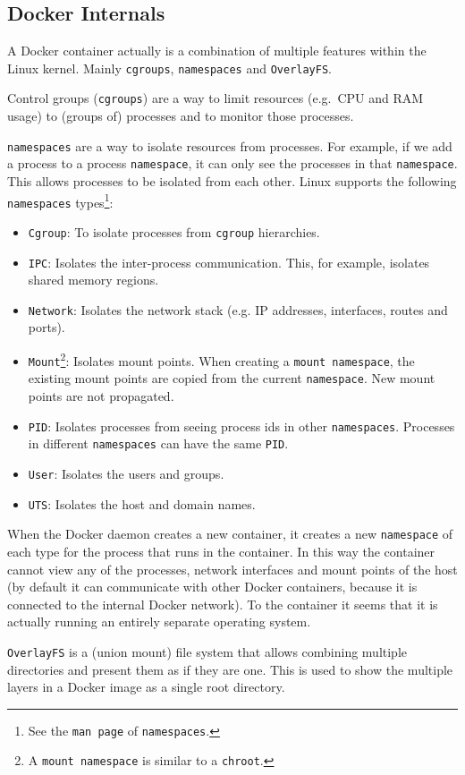 \subsection{Docker Internals}\label{subsubsection:internals}
A Docker container actually is a combination of multiple features within the Linux kernel.
Mainly \lstinline{cgroups}, \lstinline{namespaces} and \lstinline{OverlayFS}.

\medskip

Control groups (\lstinline{cgroups}) are a way to limit resources (e.g.\ CPU and RAM usage) to (groups of) processes and to monitor those processes.

\medskip

\lstinline{namespaces} are a way to isolate resources from processes. For example, if we add a process to a process \lstinline{namespace}, it can only see the processes in that \lstinline{namespace}. This allows processes to be isolated from each other. Linux supports the following \lstinline{namespaces} types\footnote{See the \lstinline{man page} of \lstinline{namespaces}.}:
\begin{itemize}
    \item \lstinline{Cgroup}: To isolate processes from \lstinline{cgroup} hierarchies.
    \item \lstinline{IPC}: Isolates the inter-process communication. This, for example, isolates shared memory regions.
    \item \lstinline{Network}: Isolates the network stack (e.g. IP addresses, interfaces, routes and ports).
    \item \lstinline{Mount}\footnote{A \lstinline{mount namespace} is similar to a \lstinline{chroot}.}: Isolates mount points. When creating a \lstinline{mount namespace}, the existing mount points are copied from the current \lstinline{namespace}. New mount points are not propagated.
    \item \lstinline{PID}: Isolates processes from seeing process ids in other \lstinline{namespaces}. Processes in different \lstinline{namespaces} can have the same \lstinline{PID}.
    \item \lstinline{User}: Isolates the users and groups.
    \item \lstinline{UTS}: Isolates the host and domain names.
\end{itemize}

When the Docker daemon creates a new container, it creates a new \lstinline{namespace} of each type for the process that runs in the container. In this way the container cannot view any of the processes, network interfaces and mount points of the host (by default it can communicate with other Docker containers, because it is connected to the internal Docker network). To the container it seems that it is actually running an entirely separate operating system.

\medskip

\lstinline{OverlayFS} is a (union mount) file system that allows combining multiple directories and present them as if they are one. This is used to show the multiple layers in a Docker image as a single root directory.

